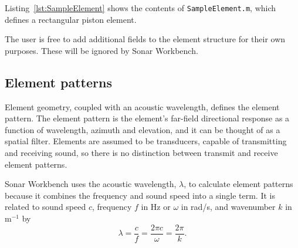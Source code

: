 Listing~\ref{lst:SampleElement} shows the contents of \texttt{SampleElement.m}, which defines a rectangular piston element.



The user is free to add additional fields to the element structure for their own purposes. These will be ignored by Sonar Workbench.

\subsection{Element patterns}

Element geometry, coupled with an acoustic wavelength, defines the element pattern. The element pattern is the element's far-field directional response as a function of wavelength, azimuth and elevation, and it can be thought of as a spatial filter. Elements are assumed to be transducers, capable of transmitting and receiving sound, so there is no distinction between transmit and receive element patterns. 

Sonar Workbench uses the acoustic wavelength, $\lambda$, to calculate element patterns because it combines the frequency and sound speed into a single term. It is related to sound speed $c$, frequency $f$ in Hz or $\omega$ in rad/s, and wavenumber $k$ in m$^{-1}$ by
\begin{equation*}
\lambda = \frac{c}{f} = \frac{2\pi{c}}{\omega} = \frac{2\pi}{k}.
\end{equation*}


